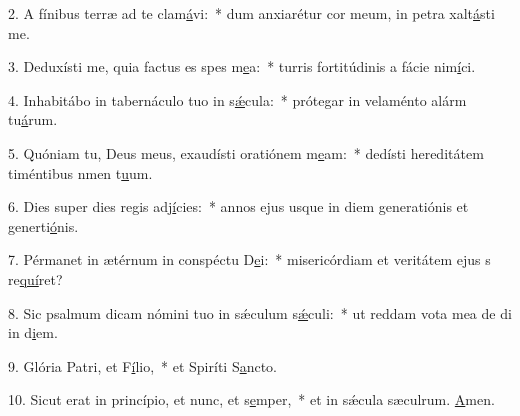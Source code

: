 2. A fínibus terræ ad te clam\uline{á}vi:~* dum anxiarétur cor meum, in petra xalt\uline{á}sti me.\par 
3. Deduxísti me, quia factus es spes m\uline{e}a:~* turris fortitúdinis a fácie nim\uline{í}ci.\par 
4. Inhabitábo in tabernáculo tuo in s\uline{ǽ}cula:~* prótegar in velaménto alárm tu\uline{á}rum.\par 
5. Quóniam tu, Deus meus, exaudísti oratiónem m\uline{e}am:~* dedísti hereditátem timéntibus nmen t\uline{u}um.\par 
6. Dies super dies regis adj\uline{í}cies:~* annos ejus usque in diem generatiónis et generti\uline{ó}nis.\par 
7. Pérmanet in ætérnum in conspéctu D\uline{e}i:~* misericórdiam et veritátem ejus s re\uline{quí}ret?\par 
8. Sic psalmum dicam nómini tuo in sǽculum s\uline{ǽ}culi:~* ut reddam vota mea de di in d\uline{i}em.\par 
9. Glória Patri, et F\uline{í}lio,~* et Spiríti S\uline{a}ncto.\par 
10. Sicut erat in princípio, et nunc, et s\uline{e}mper,~* et in sǽcula sæculrum. \uline{A}men.\par 
